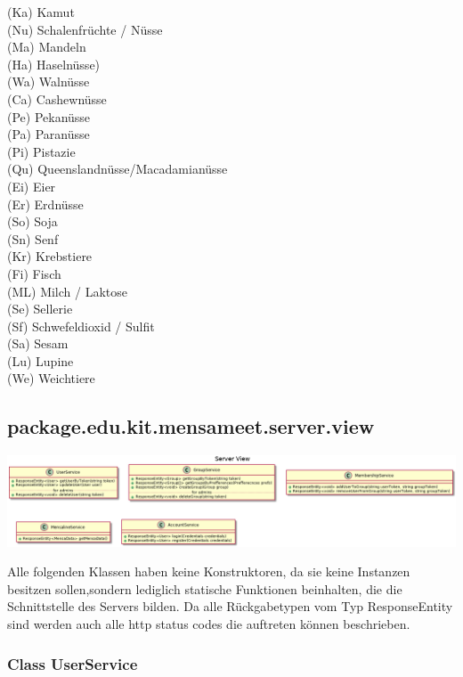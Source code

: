 \documentclass[a4paper]{scrreprt}
\begin{document}
{(Ka) Kamut \\
(Nu) Schalenfrüchte / Nüsse \\
(Ma) Mandeln \\
(Ha) Haselnüsse) \\ 
(Wa) Walnüsse \\
(Ca) Cashewnüsse \\
(Pe) Pekanüsse \\
(Pa) Paranüsse \\
(Pi) Pistazie \\
(Qu) Queenslandnüsse/Macadamianüsse \\
(Ei) Eier \\
(Er) Erdnüsse \\
(So) Soja \\
(Sn) Senf \\
(Kr) Krebstiere \\
(Fi) Fisch \\
(ML) Milch / Laktose \\
(Se) Sellerie \\
(Sf) Schwefeldioxid / Sulfit \\
(Sa) Sesam \\
(Lu) Lupine \\
(We) Weichtiere \\}



\newpage
\subsection{package.edu.kit.mensameet.server.view}

\begin{center}
	\includegraphics[width=1.1\textwidth]{Klassendiagramme/serverViewCD.png}
\end{center} 
Alle folgenden Klassen haben keine Konstruktoren, da sie keine Instanzen besitzen sollen,sondern lediglich statische Funktionen beinhalten, die die Schnittstelle des Servers bilden. Da alle Rückgabetypen vom Typ ResponseEntity sind werden auch alle http status codes die auftreten können beschrieben.

\subsubsection{Class UserService}
\end{document}
